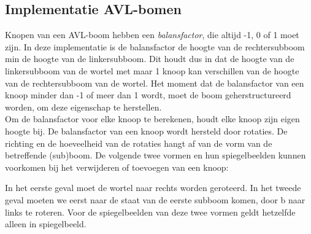 \documentclass[a4paper,10pt]{article}
\begin{document}
\subsection{Implementatie AVL-bomen}
Knopen van een AVL-boom hebben een \emph{balansfactor}, die altijd -1, 0 of 1 moet zijn. In deze implementatie is de balansfactor de hoogte van de rechtersubboom min de hoogte van de linkersubboom. Dit houdt dus in dat de hoogte van de linkersubboom van de wortel met maar 1 knoop kan verschillen van de hoogte van de rechtersubboom van de wortel. Het moment dat de balansfactor van een knoop minder dan -1 of meer dan 1 wordt, moet de boom geherstructureerd worden, om deze eigenschap te herstellen. \\

Om de balansfactor voor elke knoop te berekenen, houdt elke knoop zijn eigen hoogte bij. De balansfactor van een knoop wordt hersteld door rotaties. De richting en de hoeveelheid van de rotaties hangt af van de vorm van de betreffende (sub)boom. De volgende twee vormen en hun spiegelbeelden kunnen voorkomen bij het verwijderen of toevoegen van een knoop: \\

\begin{center}
\end{center}

In het eerste geval moet de wortel naar rechts worden geroteerd. In het tweede geval moeten we eerst naar de staat van de eerste subboom komen, door b naar links te roteren. Voor de spiegelbeelden van deze twee vormen geldt hetzelfde alleen in spiegelbeeld. \\
\end{document}
